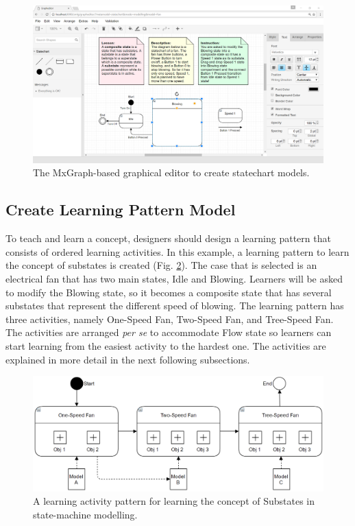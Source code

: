 \documentclass[conference]{IEEEtran}
\begin{document}
\begin{figure}[th]
\centering
\includegraphics[width=\linewidth]{ide}
\caption{The MxGraph-based graphical editor to create statechart models.}
\label{ide}
\end{figure}

\subsection{Create Learning Pattern Model}
To teach and learn a concept, designers should design a learning pattern that consists of ordered learning activities. In this example, a learning pattern to learn the concept of substates is created (Fig. \ref{eoml}). The case that is selected is an electrical fan that has two main states, Idle and Blowing. Learners will be asked to modify the Blowing state, so it becomes a composite state that has several substates that represent the different speed of blowing. The learning pattern has three activities, namely One-Speed Fan, Two-Speed Fan, and Tree-Speed Fan. The activities are arranged \textit{per se} to accommodate Flow state \cite{csikszentmihalyi2014toward} so learners can start learning from the easiest activity to the hardest one. The activities are explained in more detail in the next following subsections.
  
\begin{figure}[th]
\centering
\includegraphics[width=\linewidth]{eoml}
\caption{A learning activity pattern for learning the concept of Substates in state-machine modelling.}
\label{eoml}
\end{figure}
\end{document}
